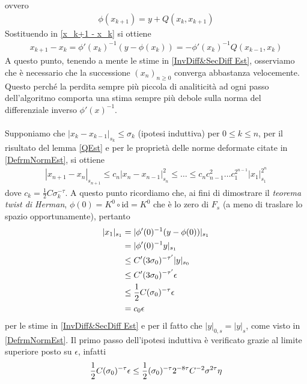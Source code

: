 \documentclass[twoside, 11pt]{amsbook}
\makeatletter
\newcommand{\0}{{(0)}}
\newcommand{\3}{{(3)}}
\theoremstyle{colonplain}
\theoremstyle{colondefinition}
\theoremstyle{colonremark}
\numberwithin{equation}{chapter}
\renewcommand{\proofname}{Dimostrazione}
\renewenvironment{proof}[1][\proofname]{\par
  \pushQED{\qed}%
  \normalfont \topsep6\p@\@plus6\p@\relax
  \trivlist
  \item[\hskip\labelsep\bfseries #1:]\ignorespaces
}{%
  \popQED\endtrivlist\@endpefalse
}
\makeatother
\begin{document}
\begin{proof}
ovvero
\begin{align}
    \phi(x_{k + 1}) = y + Q(x_k, x_{k + 1})
\end{align}
Sostituendo in \eqref{x_k+1 - x_k} si ottiene
\begin{align}
    x_{k + 1} - x_k = \phi'(x_k)^{-1}(y - \phi(x_k)) = -\phi'(x_k)^{-1}Q(x_{k - 1}, x_k)
\end{align}
A questo punto, tenendo a mente le stime in \eqref{InvDiff&SecDiff Est}, osserviamo che è necessario che la successione $(x_n)_{n \geq 0}$ converga abbastanza velocemente. Questo perché la perdita sempre più piccola di analiticità ad ogni passo dell'algoritmo comporta una stima sempre più debole sulla norma del differenziale inverso $\phi'(x)^{-1}$. \\ \\
Supponiamo che $|x_k - x_{k - 1}|_{s_k} \leq \sigma_k$ (ipotesi induttiva) per $0 \leq k \leq n$, per il risultato del lemma \ref{QEst} e per le proprietà delle norme deformate citate in \eqref{DefrmNormEst}, si ottiene
\begin{align}\label{IndHP}
    |x_{n + 1} - x_n|_{s_{n + 1}} \leq c_n|x_n - x_{n - 1}|^2_{s_n} \leq \dots \leq c_n c^2_{n - 1} \dots c^{2^{n - 1}}_1|x_1|^{2^n}_{s_1}
\end{align}
dove $c_k = \frac{1}{2}C\sigma^{-\tau}_k$. A questo punto ricordiamo che, ai fini di dimostrare il \textit{teorema twist di Herman}, $\phi(0) = K^0 \circ \mathrm{id} = K^0$ che è lo zero di $F_s$ (a meno di traslare lo spazio opportunamente), pertanto
\begin{align}\label{IndFirstStep}
    |x_1|_{s_1} &= |\phi'(0)^{-1}(y - \phi(0))|_{s_1} \notag \\
    &= |\phi'(0)^{-1}y|_{s_1} \\
    &\leq C'(3\sigma_0)^{-\tau'}|y|_{s_0} \notag \\
    &\leq C'(3\sigma_0)^{-\tau'}\epsilon \notag \\
    &\leq \frac{1}{2}C(\sigma_0)^{-\tau}\epsilon \notag \\
    &= c_0\epsilon
\end{align}
per le stime in \eqref{InvDiff&SecDiff Est} e per il fatto che $|y|_{0, s} = |y|_s$, come visto in \eqref{DefrmNormEst}. Il primo passo dell'ipotesi induttiva è verificato grazie al limite superiore posto su $\epsilon$, infatti
\begin{align}
    \frac{1}{2}C(\sigma_0)^{-\tau}\epsilon &\leq \frac{1}{2}(\sigma_0)^{-\tau}2^{-8\tau}C^{-2}\sigma^{2\tau}\eta \notag \\

\end{align}
\end{proof}
\end{document}
